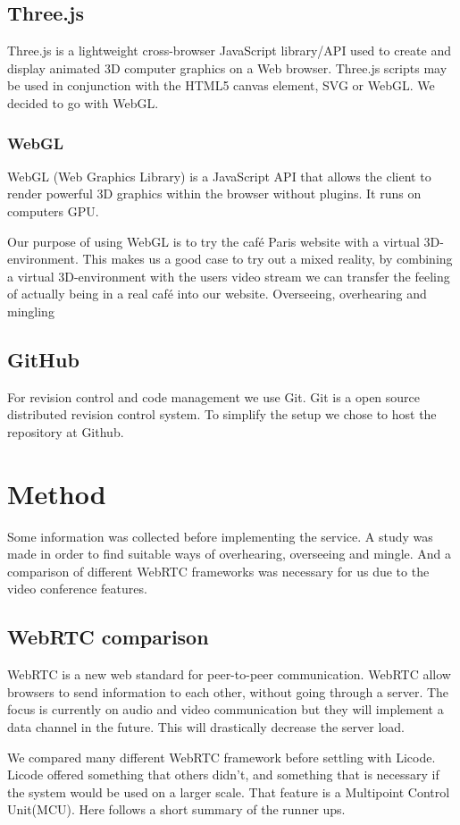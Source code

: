 \documentclass[12pt, titlepage]{article}
\begin{document}
\subsection{Three.js}
Three.js\cite{33} is a lightweight cross-browser JavaScript library/API used to create and display animated 3D computer graphics on a Web browser. Three.js scripts may be used in conjunction with the HTML5 canvas element, SVG or WebGL. We decided to go with WebGL.
\subsubsection{WebGL}
WebGL (Web Graphics Library) is a JavaScript API that allows the client to render powerful 3D graphics within the browser without plugins. It runs on computers GPU.

Our purpose of using WebGL is to try the café Paris website with a virtual 3D-environment. This makes us a good case to try out a mixed reality, by combining a virtual 3D-environment with the users video stream we can transfer the feeling of actually being in a real café into our website. Overseeing, overhearing and mingling
\subsection{GitHub}
For revision control and code management we use Git. Git is a open source distributed revision control system. To simplify the setup we chose to host the repository at Github\cite{34}.

\section{Method}
Some information was collected before implementing the service. A study was made in order to find suitable ways of overhearing, overseeing and mingle. And a comparison of different WebRTC frameworks was necessary for us due to the video conference features.
\subsection{WebRTC comparison}
WebRTC is a new web standard for peer-to-peer communication. WebRTC allow browsers to send information to each other, without going through a server. The focus is currently on audio and video communication but they will implement a data channel in the future. This will drastically decrease the server load.

We compared many different WebRTC framework before settling with Licode. Licode offered something that others didn't, and something that is necessary if the system would be used on a larger scale. That feature is a Multipoint Control Unit(MCU). Here follows a short summary of the runner ups.
\end{document}
